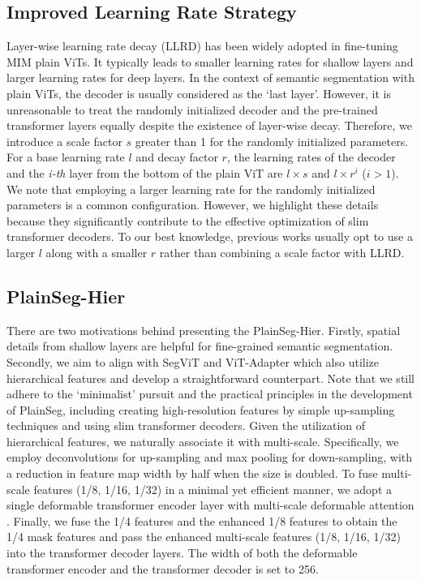 \documentclass{article} \usepackage{iclr2024_conference,times}
\begin{document}
\subsection{Improved Learning Rate Strategy}

Layer-wise learning rate decay (LLRD) has been widely adopted in fine-tuning MIM plain ViTs. It typically leads to smaller learning rates for shallow layers and larger learning rates for deep layers. In the context of semantic segmentation with plain ViTs, the decoder is usually considered as the `last layer'. However, it is unreasonable to treat the randomly initialized decoder and the pre-trained transformer layers equally despite the existence of layer-wise decay. Therefore, we introduce a scale factor $s$ greater than 1 for the randomly initialized parameters. For a base learning rate $l$ and decay factor $r$, the learning rates of the decoder and the \textit{i-th} layer from the bottom of the plain ViT are $l \times s$ and $l \times r^{i}$ ($i > 1$). We note that employing a larger learning rate for the randomly initialized parameters is a common configuration. However, we highlight these details because they significantly contribute to the effective optimization of slim transformer decoders. To our best knowledge, previous works usually opt to use a larger $l$ along with a smaller $r$ rather than combining a scale factor with LLRD.

\subsection{PlainSeg-Hier}
\label{PlainSeg-Hier}

There are two motivations behind presenting the PlainSeg-Hier. Firstly, spatial details from shallow layers are helpful for fine-grained semantic segmentation. Secondly, we aim to align with SegViT and ViT-Adapter which also utilize hierarchical features and develop a straightforward counterpart. Note that we still adhere to the `minimalist' pursuit and the practical principles in the development of PlainSeg, including creating high-resolution features by simple up-sampling techniques and using slim transformer decoders. Given the utilization of hierarchical features, we naturally associate it with multi-scale. Specifically, we employ deconvolutions for up-sampling and max pooling for down-sampling, with a reduction in feature map width by half when the size is doubled. To fuse multi-scale features (1/8, 1/16, 1/32) in a minimal yet efficient manner, we adopt a single deformable transformer encoder layer with multi-scale deformable attention \citep{zhu2021deformable}. Finally, we fuse the 1/4 features and the enhanced 1/8 features to obtain the 1/4 mask features and pass the enhanced multi-scale features (1/8, 1/16, 1/32) into the transformer decoder layers. The width of both the deformable transformer encoder and the transformer decoder is set to 256.
\end{document}
